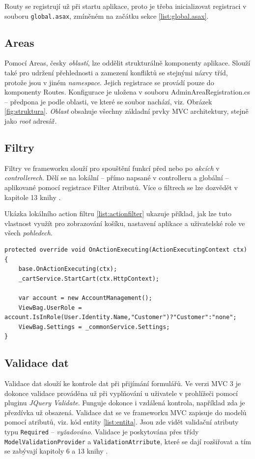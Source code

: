 \documentclass[11pt,twoside,a4paper]{book}
\begin{document}
Routy se registrují už při startu aplikace, proto je třeba inicializovat registraci v souboru \texttt{global.asax}, zmíněném na začátku sekce \ref{list:global.asax}.

\subsection{Areas}
\label{sec:areas}
Pomocí \textsf{Areas}, česky \textit{oblastí}, lze oddělit strukturálně komponenty aplikace. Slouží také pro udržení přehlednosti a zamezení konfliktů se stejnými názvy tříd, protože jsou v jiném \textit{namespace}. Jejich registrace se provádí pouze do komponenty \textsf{Routes}. Konfigurace je uložena v souboru AdminAreaRegistration.cs -- předpona je podle oblasti, ve které se soubor nachází, viz. Obrázek \ref{fig:struktura}. \textit{Oblast} obsahuje všechny základní prvky MVC architektury, stejně jako \textit{root} adresář.

\subsection{Filtry}
Filtry ve frameworku slouží pro spouštění funkcí před nebo po \textit{akcích} v \textit{controllerech}. Dělí se na lokální -- přímo napsané v controlleru a globální -- aplikované pomocí registrace \textsf{Filter Atributů}. Více o filtrech se lze dozvědět v kapitole 13 knihy \cite{MVC2}.

Ukázka lokálního action filtru \ref{list:actionfilter} ukazuje příklad, jak lze tuto vlastnost využít pro zobrazování košíku, nastavení aplikace a uživatelské role ve všech \textit{pohledech}.

\begin{lstlisting}[float=h!,language=CSharp, caption={Action Filter}, label=list:actionfilter]
protected override void OnActionExecuting(ActionExecutingContext ctx)
{
	base.OnActionExecuting(ctx);
	_cartService.StartCart(ctx.HttpContext);

	var account = new AccountManagement();
	ViewBag.UserRole = account.IsInRole(User.Identity.Name,"Customer")?"Customer":"none";
	ViewBag.Settings = _commonService.Settings;
}
\end{lstlisting}

\subsection{Validace dat}
\label{sec:validacedat}
Validace dat slouží ke kontrole dat při přijímání formulářů. Ve verzi MVC 3 je dokonce validace prováděna už při vyplňování u uživatele v prohlížeči pomocí pluginu \textit{JQuery Validate}. Funguje dokonce i vzdálená kontrola, například zda je přezdívka už obsazená. Validace dat se ve frameworku MVC zapisuje do modelů pomocí atributů, viz. kód entity \ref{list:entita}. Jsou zde vidět validační atributy typu \texttt{Required} -- \textit{vyžadováno}. Validace je poskytována přes třídy \texttt{ModelValidationProvider} a \texttt{ValidationAtrribute}, které se dají rozšiřovat a tím se zabývají kapitoly 6 a 13 knihy \cite{MVC1}.
\end{document}

